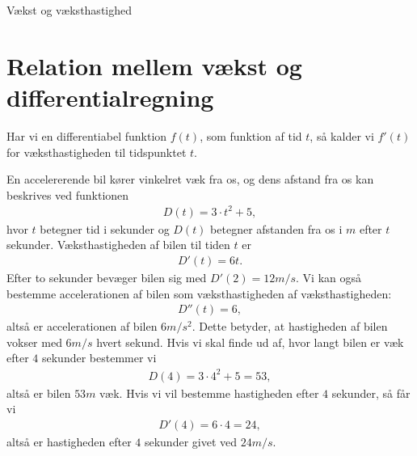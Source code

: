 \documentclass[12pt]{article}
\begin{document}


\begin{center}
\Huge
Vækst og væksthastighed
\end{center}

\section*{Relation mellem vækst og differentialregning}

\begin{defn}
Har vi en differentiabel funktion $f(t)$, som funktion af tid $t$, så kalder vi $f'(t)$ for væksthastigheden til tidspunktet $t$. 
\end{defn}
\begin{exa}
En accelererende bil kører vinkelret væk fra os, og dens afstand fra os kan beskrives ved funktionen \begin{align*}
D(t) = 3\cdot t^2 + 5,
\end{align*}
hvor $t$ betegner tid i sekunder og $D(t)$ betegner afstanden fra os i $m$ efter $t$ sekunder. Væksthastigheden af bilen til tiden $t$ er 
\begin{align*}
D'(t) = 6t.
\end{align*}
Efter to sekunder bevæger bilen sig med $D'(2) = 12 m/s.$ Vi kan også bestemme accelerationen af bilen som væksthastigheden af væksthastigheden:
\begin{align*}
D''(t) = 6,
\end{align*}
altså er accelerationen af bilen $6m/s^2$. Dette betyder, at hastigheden af bilen vokser med $6m/s$ hvert sekund.  
Hvis vi skal finde ud af, hvor langt bilen er væk efter $4$ sekunder bestemmer vi
\begin{align*}
D(4) = 3\cdot 4^2 +5 = 53,
\end{align*}
altså er bilen $53 m$ væk. 
Hvis vi vil bestemme hastigheden efter $4$ sekunder, så får vi 
\begin{align*}
D'(4) = 6\cdot 4 = 24, 
\end{align*}
altså er hastigheden efter $4$ sekunder givet ved $24 m/s$.
\end{exa}
\end{document}
